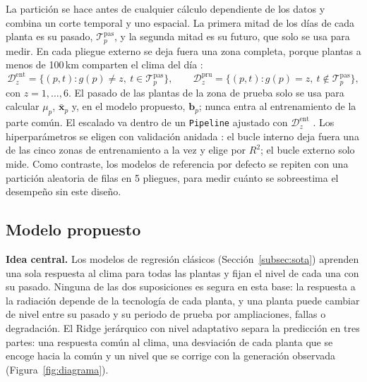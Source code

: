 \documentclass[pdflatex,sn-mathphys-num]{sn-jnl}
\begin{document}
La partición se hace antes de cualquier cálculo dependiente de los datos y combina un corte temporal y uno espacial. La primera mitad de los días de cada planta es su pasado, $\mathcal{T}^{\text{pas}}_p$, y la segunda mitad es su futuro, que solo se usa para medir. En cada pliegue externo se deja fuera una zona completa, porque plantas a menos de 100\,km comparten el clima del día \cite{roberts2017cv}:
\begin{equation}
\mathcal{D}^{\text{ent}}_z = \{(p,t): g(p)\neq z,\ t\in\mathcal{T}^{\text{pas}}_p\}, \qquad
\mathcal{D}^{\text{pru}}_z = \{(p,t): g(p)= z,\ t\notin\mathcal{T}^{\text{pas}}_p\},
\label{eq:particion}
\end{equation}
con $z = 1,\dots,6$. El pasado de las plantas de la zona de prueba solo se usa para calcular $\mu_p$, $\bar{\mathbf{x}}_p$ y, en el modelo propuesto, $\mathbf{b}_p$; nunca entra al entrenamiento de la parte común. El escalado va dentro de un \texttt{Pipeline} ajustado con $\mathcal{D}^{\text{ent}}_z$ \cite{kaufman2012leakage}. Los hiperparámetros se eligen con validación anidada \cite{varma2006bias,cawley2010overfitting}: el bucle interno deja fuera una de las cinco zonas de entrenamiento a la vez y elige por $R^2$; el bucle externo solo mide. Como contraste, los modelos de referencia por defecto se repiten con una partición aleatoria de filas en 5 pliegues, para medir cuánto se sobreestima el desempeño sin este diseño.


\subsection{Modelo propuesto}\label{subsec:propuesto}

\textbf{Idea central.} Los modelos de regresión clásicos (Sección~\ref{subsec:sota}) aprenden una sola respuesta al clima para todas las plantas y fijan el nivel de cada una con su pasado. Ninguna de las dos suposiciones es segura en esta base: la respuesta a la radiación depende de la tecnología de cada planta, y una planta puede cambiar de nivel entre su pasado y su periodo de prueba por ampliaciones, fallas o degradación. El Ridge jerárquico con nivel adaptativo separa la predicción en tres partes: una respuesta común al clima, una desviación de cada planta que se encoge hacia la común y un nivel que se corrige con la generación observada (Figura~\ref{fig:diagrama}).
\end{document}
